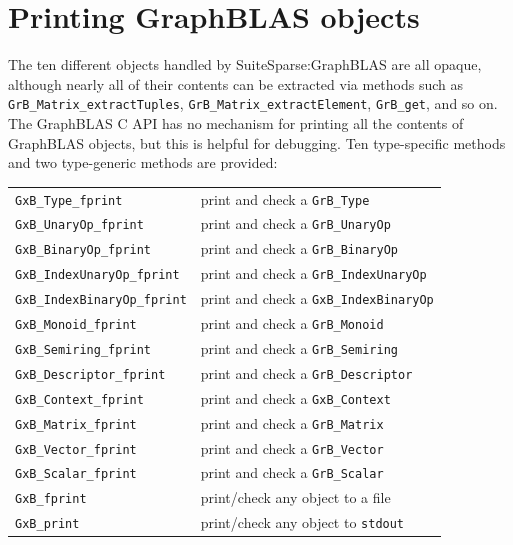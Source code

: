 \newpage
\section{Printing GraphBLAS objects} %
\label{fprint}

The ten different objects handled by SuiteSparse:GraphBLAS are all opaque,
although nearly all of their contents can be extracted via methods such as
\verb'GrB_Matrix_extractTuples', \verb'GrB_Matrix_extractElement',
\verb'GrB_get', and so on.  The GraphBLAS C API has no mechanism for
printing all the contents of GraphBLAS objects, but this is helpful for
debugging.  Ten type-specific methods and two type-generic methods are
provided:

\vspace{0.2in}
{\footnotesize
\begin{tabular}{ll}
\hline
\verb'GxB_Type_fprint'         & print and check a \verb'GrB_Type' \\
\verb'GxB_UnaryOp_fprint'      & print and check a \verb'GrB_UnaryOp' \\
\verb'GxB_BinaryOp_fprint'     & print and check a \verb'GrB_BinaryOp' \\
\verb'GxB_IndexUnaryOp_fprint' & print and check a \verb'GrB_IndexUnaryOp' \\
\verb'GxB_IndexBinaryOp_fprint'& print and check a \verb'GxB_IndexBinaryOp' \\
\verb'GxB_Monoid_fprint'       & print and check a \verb'GrB_Monoid' \\
\verb'GxB_Semiring_fprint'     & print and check a \verb'GrB_Semiring' \\
\verb'GxB_Descriptor_fprint'   & print and check a \verb'GrB_Descriptor' \\
\verb'GxB_Context_fprint'      & print and check a \verb'GxB_Context' \\
\verb'GxB_Matrix_fprint'       & print and check a \verb'GrB_Matrix' \\
\verb'GxB_Vector_fprint'       & print and check a \verb'GrB_Vector' \\
\verb'GxB_Scalar_fprint'       & print and check a \verb'GrB_Scalar' \\
\hline
\verb'GxB_fprint'             & print/check any object to a file \\
\verb'GxB_print'              & print/check any object to \verb'stdout' \\
\hline
\end{tabular}
}
\vspace{0.2in}

